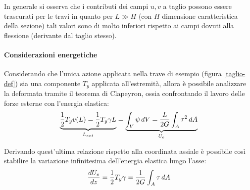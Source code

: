 		\begin{osservazione}
			In generale si osserva che i contributi dei campi $u,v$ a taglio possono essere trascurati per le travi in quanto per $L\gg H$ (con $H$ dimensione caratteristica della sezione) tali valori sono di molto inferiori rispetto ai campi dovuti alla flessione (derivante dal taglio stesso).
		\end{osservazione}
		
		\paragraph{Considerazioni energetiche} Considerando che l'unica azione applicata nella trave di esempio (figura \ref{taglio-def}) sia una componente $T_y$ applicata all'estremità, allora è possibile analizzare la deformata tramite il teorema di Clapeyron, ossia confrontando il lavoro delle forze esterne con l'energia elastica:
		\[ \underbrace{\frac 1 2 T_y v(L) = \frac 1 2 T_y \gamma L }_{L_{ext}} = \underbrace{\int_V \psi\, dV = \frac L {2G} \int_A \tau^2\, dA }_{U_e} \]
		\begin{concetto}
			Derivando quest'ultima relazione rispetto alla coordinata assiale è possibile così stabilire la variazione infinitesima dell'energia elastica lungo l'asse:
			\begin{equation} \label{eq:taglio:der-energia}
				\frac{dU_e}{dz} = \frac 1 2 T_y \gamma = \frac 1 {2G}\int_A \tau\, dA
			\end{equation}
		\end{concetto}
	
